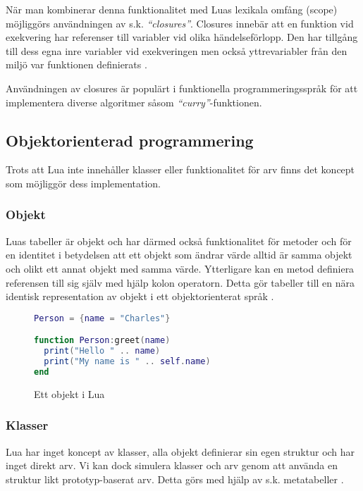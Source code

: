 När man kombinerar denna funktionalitet med Luas lexikala omfång (scope)
möjliggörs användningen av s.k. \textit{``closures''}. Closures innebär att
en funktion vid exekvering har referenser till variabler vid olika
händelseförlopp. Den har tillgång till dess egna inre variabler vid
exekveringen men också yttrevariabler från den miljö var funktionen
definierats \citep[s. 45]{ir06}.

Användningen av closures är populärt i funktionella programmeringsspråk för
att implementera diverse algoritmer såsom \textit{``curry''}-funktionen.

\subsection{Objektorienterad programmering}

Trots att Lua inte innehåller klasser eller funktionalitet för arv finns det
koncept som möjliggör dess implementation.

\subsubsection{Objekt}

Luas tabeller är objekt och har därmed också funktionalitet för metoder och
för en identitet i betydelsen att ett objekt som ändrar värde alltid är samma
objekt och olikt ett annat objekt med samma värde. Ytterligare kan en metod
definiera referensen till sig själv med hjälp kolon operatorn. Detta gör
tabeller till en nära identisk representation av objekt i ett objektorienterat
språk \citep[s. 149]{ir06}.

\begin{figure}[ht]
  \begin{lstlisting}[language=Lua]
Person = {name = "Charles"}

function Person:greet(name)
  print("Hello " .. name)
  print("My name is " .. self.name)
end
  \end{lstlisting}
  \caption{Ett objekt i Lua}
\end{figure}

\subsubsection{Klasser}

Lua har inget koncept av klasser, alla objekt definierar sin egen struktur och
har inget direkt arv. Vi kan dock simulera klasser och arv genom att använda
en struktur likt prototyp-baserat arv. Detta görs med hjälp av s.k.
metatabeller \citep[s. 151]{ir06}.

